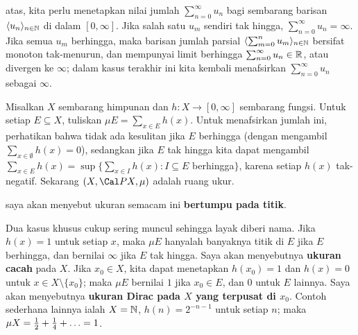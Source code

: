 atas, kita perlu menetapkan nilai jumlah $\sum_{n=0}^{\infty}u_n$ bagi
sembarang barisan $\langle u_n\rangle_{n\in\Bbb N}$ di dalam
$[0,\infty]$.  %
Jika salah satu $u_m$ sendiri tak hingga,  $\sum_{n=0}^{\infty}u_n=\infty$. Jika semua $u_m$
berhingga, maka barisan jumlah
parsial $\langle\sum_{m=0}^nu_m\rangle_{n\in\Bbb N}$ bersifat monoton
tak-menurun, dan mempunyai limit berhingga
$\sum_{n=0}^{\infty}u_n\in\Bbb R$, atau divergen ke $\infty$; dalam
kasus terakhir ini kita kembali menafsirkan
$\sum_{n=0}^{\infty}u_n$ sebagai $\infty$.

 Misalkan $X$ sembarang himpunan dan
$h:X\to[0,\infty]$ sembarang fungsi. Untuk setiap $E\subseteq X$,
tuliskan $\mu E=\sum_{x\in E}h(x)$. Untuk menafsirkan jumlah ini,
perhatikan bahwa tidak ada kesulitan jika $E$ berhingga (dengan
mengambil $\sum_{x\in\emptyset}h(x)=0$), sedangkan jika $E$ tak hingga
kita dapat mengambil
$\sum_{x\in E}h(x)=\sup\{\sum_{x\in I}h(x):I\subseteq E$ berhingga$\}$,
karena setiap $h(x)$ tak-negatif. 
Sekarang $(X,\Cal PX,\mu)$ adalah ruang ukur.

 saya akan menyebut ukuran semacam ini {\bf bertumpu pada
titik}.

Dua kasus khusus cukup sering muncul sehingga layak diberi nama. Jika
$h(x)=1$ untuk setiap $x$, maka $\mu E$ hanyalah banyaknya titik di
$E$ jika $E$ berhingga, dan bernilai $\infty$ jika $E$ tak hingga.
Saya akan menyebutnya {\bf ukuran cacah} pada $X$. Jika $x_0\in X$,
kita dapat menetapkan $h(x_0)=1$ dan $h(x)=0$ untuk
$x\in X\setminus\{x_0\}$; maka $\mu E$ bernilai $1$ jika $x_0\in E$,
dan $0$ untuk $E$ lainnya. Saya akan menyebutnya {\bf ukuran Dirac pada
$X$ yang terpusat di $x_0$}. Contoh sederhana lainnya ialah
$X=\Bbb N$, $h(n)=2^{-n-1}$ untuk setiap $n$; maka
$\mu X={1\over 2}+{1\over 4}+\ldots=1$.

